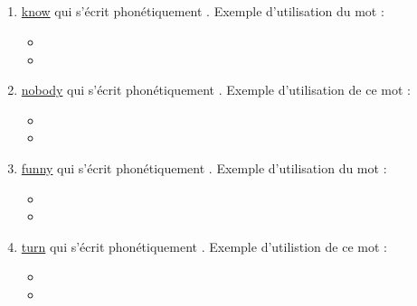 \subsection{}\label{sec:n}

\begin{enumerate}
\item \href{http://www.wordreference.com/enfr/know}{know} qui s'écrit phonétiquement \href{https://en.oxforddictionaries.com/definition/know}{}. Exemple d'utilisation du
mot : 

\begin{itemize}
\item{}
\item{}
\end{itemize}

\item \href{http://www.wordreference.com/enfr/nobody}{nobody} qui s'écrit phonétiquement \href{https://en.oxforddictionaries.com/definition/nobody}{}. Exemple d'utilisation
de ce mot :

\begin{itemize}
\item{}
\item{}
\end{itemize}

\item \href{http://www.wordreference.com/enfr/funny}{funny} qui s'écrit phonétiquement \href{https://en.oxforddictionaries.com/definition/funny}{}. Exemple d'utilisation du
  mot :
  
\begin{itemize}
\item{}
\item{}
\end{itemize}

\item \href{http://www.wordreference.com/enfr/turn}{turn} qui s'écrit phonétiquement \href{https://en.oxforddictionaries.com/definition/turn}{}. Exemple d'utilistion de ce
mot : 

\begin{itemize}
\item{}
\item{}
\end{itemize}

\end{enumerate}

